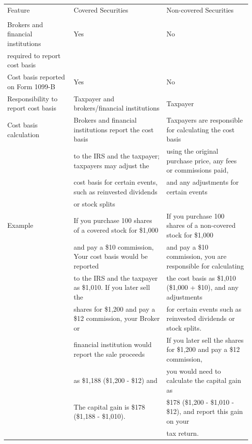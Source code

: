 \documentclass[11pt]{article}
\begin{document}
\begin{center}
\begin{tabular}{lll}
\hline
Feature & Covered Securities & Non-covered Securities\\[0pt]
 &  & \\[0pt]
\hline
Brokers and financial institutions & Yes & No\\[0pt]
required to report cost basis &  & \\[0pt]
\hline
Cost basis reported on Form 1099-B & Yes & No\\[0pt]
Responsibility to report cost basis & Taxpayer and brokers/financial institutions & Taxpayer\\[0pt]
Cost basis calculation & Brokers and financial institutions report the cost basis & Taxpayers are responsible for calculating the cost basis\\[0pt]
 & to the IRS and the taxpayer; taxpayers may adjust the & using the original purchase price, any fees or commissions paid,\\[0pt]
 & cost basis for certain events, such as reinvested dividends & and any adjustments for certain events\\[0pt]
 & or stock splits & \\[0pt]
\hline
Example & If you purchase 100 shares of a covered stock for \$1,000 & If you purchase 100 shares of a non-covered stock for \$1,000\\[0pt]
 & and pay a \$10 commission, Your cost basis would be reported & and pay a \$10 commission, you are responsible for calculating\\[0pt]
 & to the IRS and the taxpayer as \$1,010. If you later sell the & the cost basis as \$1,010 (\$1,000 + \$10), and any adjustments\\[0pt]
 & shares for \$1,200 and pay a \$12 commission, your Broker or & for certain events such as reinvested dividends or stock splits.\\[0pt]
 & financial institution would report the sale proceeds & If you later sell the shares for \$1,200 and pay a \$12 commission,\\[0pt]
 & as \$1,188 (\$1,200 - \$12) and & you would need to calculate the capital gain as\\[0pt]
 & The capital gain is \$178 (\$1,188 - \$1,010). & \$178 (\$1,200 - \$1,010 - \$12), and report this gain on your\\[0pt]
 &  & tax return.\\[0pt]
\hline
\end{tabular}
\end{center}
\end{document}
